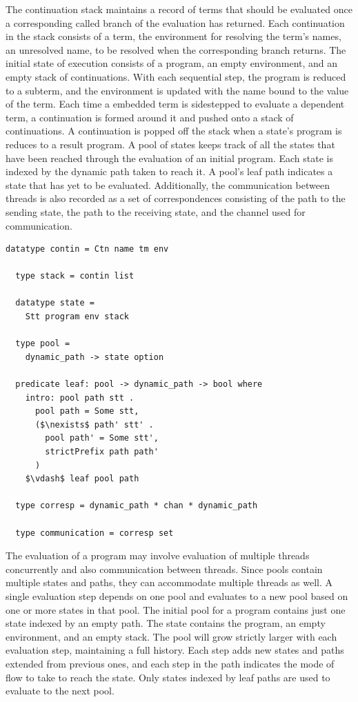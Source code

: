 \documentclass[letterpaper, 11pt]{extarticle}
\begin{document}
The continuation stack maintains a record of terms that should be evaluated
once a corresponding called branch of the evaluation has returned.
Each continuation in the stack consists of a term, the environment for resolving the
term's names, an unresolved name, to be resolved when the corresponding branch returns. 
The initial state of execution consists of a program, an empty environment, and an empty stack
of continuations. With each sequential step, the program is reduced to a subterm,
and the environment is updated with the name bound to the value of the term. Each time a
embedded term is sidestepped to evaluate a dependent term, a continuation is formed around
it and pushed onto a stack of continuations. A continuation is popped off the stack when a
state's program is reduces to a result program. A pool of states keeps track of all the states
that have been reached through the evaluation of an initial program. Each state is indexed by
the dynamic path taken to reach it. A pool's leaf path indicates a state that has yet to be
evaluated. Additionally, the communication between threads is also recorded as a set of
correspondences consisting of the path to the sending state, the path to the receiving state,
and the channel used for communication.

\begin{lstlisting}[language=logic, mathescape]
  datatype contin = Ctn name tm env

  type stack = contin list

  datatype state =
    Stt program env stack 

  type pool =
    dynamic_path -> state option

  predicate leaf: pool -> dynamic_path -> bool where
    intro: pool path stt .
      pool path = Some stt,
      ($\nexists$ path' stt' .
        pool path' = Some stt',
        strictPrefix path path'
      )
    $\vdash$ leaf pool path

  type corresp = dynamic_path * chan * dynamic_path

  type communication = corresp set 
\end{lstlisting}

The evaluation of a program may involve evaluation of multiple threads concurrently and also
communication between threads. Since pools contain multiple states and paths, they can
accommodate multiple threads as well. A single evaluation step depends on one pool and
evaluates to a new pool based on one or more states in that pool. The initial pool for a
program contains just one state indexed by an empty path. The state contains the program, an
empty environment, and an empty stack. The pool will grow strictly larger with each evaluation
step, maintaining a full history. Each step adds new states and paths extended from previous
ones, and each step in the path indicates the mode of flow to take to reach the state.
Only states indexed by leaf paths are used to evaluate to the next pool.
\end{document}
